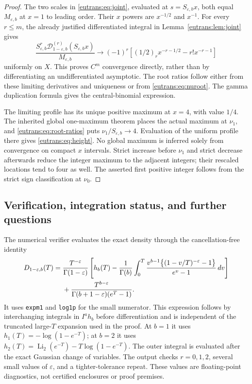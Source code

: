 \documentclass[11pt,a4paper]{article}
\numberwithin{equation}{section}
\theoremstyle{definition}
\theoremstyle{remark}
\begin{document}
\begin{proof}
The two scales in \eqref{eutrans:eq:joint}, evaluated at
$s=S_{\varepsilon,b}x$, both equal $M_{\varepsilon,b}$ at $x=1$
to leading order. Their $x$ powers are $x^{-1/2}$ and $x^{-1}$.
For every $r\leq m$, the already justified differentiated integral
in Lemma~\ref{eutrans:lem:joint} gives
\[
 \frac{S_{\varepsilon,b}^r
             \mathcal D_{1-\varepsilon,b}^{(r)}
                        (S_{\varepsilon,b}x)}{M_{\varepsilon,b}}
 \longrightarrow(-1)^r\left[
     (1/2)_r x^{-r-1/2}-r!x^{-r-1}\right]
\]
uniformly on $X$. This proves $C^m$ convergence directly, rather than
by differentiating an undifferentiated asymptotic. The root ratios
follow either from these limiting derivatives and uniqueness or
from \eqref{eutrans:eq:nuroot}. The gamma duplication formula gives
the central-binomial expression.

The limiting profile has its unique positive maximum at $x=4$, with
value $1/4$. The inherited global one-maximum theorem places the
actual maximum at $\nu_1$, and \eqref{eutrans:eq:root-ratios} puts
$\nu_1/S_{\varepsilon,b}\to4$. Evaluation of the uniform profile
there gives \eqref{eutrans:eq:height}. No global maximum is inferred
solely from convergence on compact $x$ intervals.
Strict increase before $\nu_1$ and strict decrease afterwards reduce
the integer maximum to the adjacent integers; their rescaled
locations tend to four as well. The asserted first positive integer
follows from the strict sign classification at $\nu_0$.
\end{proof}

\subsection{Verification, integration status, and further questions}

The numerical verifier evaluates the exact density through the
cancellation-free identity
\begin{align}\label{eutrans:eq:numerical-density}
 D_{1-\varepsilon,b}(T)
 ={}&\frac{T^{-\varepsilon}}{\Gamma(1-\varepsilon)}
  \left[h_b(T)-\frac1{\Gamma(b)}\int_0^T
   \frac{v^{b-1}\bigl\{(1-v/T)^{-\varepsilon}-1\bigr\}}
        {e^v-1}\,dv\right]\notag\\
 &+\frac{T^{b-\varepsilon}}{\Gamma(b+1-\varepsilon)(e^T-1)}.
\end{align}
It uses \texttt{expm1} and \texttt{log1p} for the small numerator.
This expression follows by interchanging integrals in $I^ah_b$
before differentiation and is independent of the truncated large-$T$
expansion used in the proof. At $b=1$ it uses
$h_1(T)=-\log(1-e^{-T})$; at $b=2$ it uses
$h_2(T)=\operatorname{Li}_2(e^{-T})-T\log(1-e^{-T})$.
The outer integral is evaluated after the exact Gaussian change of
variables. The output checks $r=0,1,2$, several small values of
$\varepsilon$, and a tighter-tolerance repeat. These values are
floating-point diagnostics, not certified enclosures or proof premises.
\end{document}
